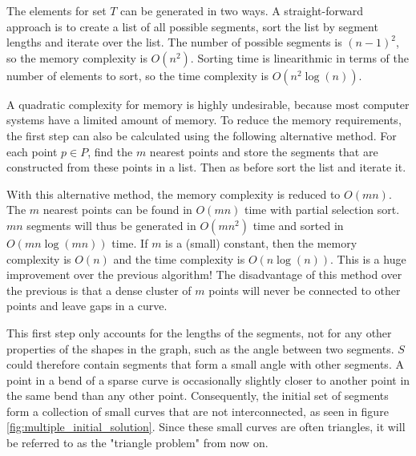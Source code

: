 \documentclass[11pt]{article}
\begin{document}

The elements for set $T$ can be generated in two ways. A straight-forward approach is to create a list of all possible segments, sort the list by segment lengths and iterate over the list. The number of possible segments is $(n-1)^2$, so the memory complexity is $O(n^2)$. Sorting time is linearithmic in terms of the number of elements to sort, so the time complexity is $O(n^2\log(n))$.

A quadratic complexity for memory is highly undesirable, because most computer systems have a limited amount of memory. To reduce the memory requirements, the first step can also be calculated using the following alternative method. For each point $p \in P$, find the $m$ nearest points and store the segments that are constructed from these points in a list. Then as before sort the list and iterate it.

With this alternative method, the memory complexity is reduced to $O(mn)$. The $m$ nearest points can be found in $O(mn)$ time with partial selection sort.
 $mn$ segments will thus be generated in $O(mn^2)$ time and sorted in $O(mn\log(mn))$ time. If $m$ is a (small) constant, then the memory complexity is $O(n)$ and the time complexity is $O(n\log(n))$. This is a huge improvement over the previous algorithm! The disadvantage of this method over the previous is that a dense cluster of $m$ points will never be connected to other points and leave gaps in a curve.

This first step only accounts for the lengths of the segments, not for any other properties of the shapes in the graph, such as the angle between two segments. $S$ could therefore contain segments that form a small angle with other segments.
A point in a bend of a sparse curve is occasionally slightly closer to another point in the same bend than any other point. Consequently, the initial set of segments form a collection of small curves that are not interconnected, as seen in figure \ref{fig:multiple_initial_solution}. Since these small curves are often triangles, it will be referred to as the "triangle problem" from now on.
\end{document}
